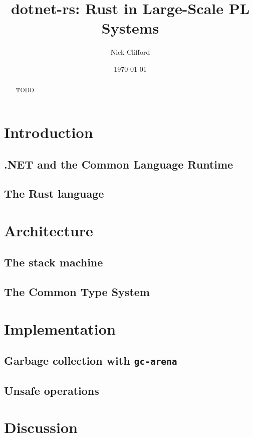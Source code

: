 \documentclass[12pt]{article}
\title{dotnet-rs: Rust in Large-Scale PL Systems}
\author{Nick Clifford}
\date{\today}
\begin{document}
    \maketitle

    \begin{abstract}
        TODO
    \end{abstract}
    
    \section{Introduction}

    \subsection{.NET and the Common Language Runtime}

    \subsection{The Rust language}

    \section{Architecture}
    
    \subsection{The stack machine}

    \subsection{The Common Type System}
    
    \section{Implementation}
    
    \subsection{Garbage collection with \texttt{gc-arena}}
    
    \subsection{Unsafe operations}

    \section{Discussion}
\end{document}
